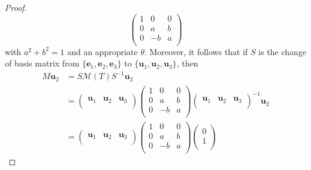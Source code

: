 \documentclass[../psets.tex]{subfiles}
\begin{document}
\begin{enumerate}
\begin{enumerate}
\begin{proof}
\begin{equation*}
                \begin{pmatrix}
                    1 & 0 & 0\\
                    0 & a & b\\
                    0 & -b & a\\
                \end{pmatrix}
            \end{equation*}
            with $a^2+b^2=1$ and an appropriate $\theta$. Moreover, it follows that if $S$ is the change of basis matrix from $\{\mathbf{e}_1,\mathbf{e}_2,\mathbf{e}_3\}$ to $\{\mathbf{u}_1,\mathbf{u}_2,\mathbf{u}_3\}$, then
            \begin{align*}
                M\mathbf{u}_2 &= S\mathcal{M}(T)S^{-1}\mathbf{u}_2\\
                &=
                \begin{pmatrix}
                    \mathbf{u}_1 & \mathbf{u}_2 & \mathbf{u}_3\\
                \end{pmatrix}
                \begin{pmatrix}
                    1 & 0 & 0\\
                    0 & a & b\\
                    0 & -b & a\\
                \end{pmatrix}
                \begin{pmatrix}
                    \mathbf{u}_1 & \mathbf{u}_2 & \mathbf{u}_3\\
                \end{pmatrix}^{-1}
                \mathbf{u}_2\\
                &=
                \begin{pmatrix}
                    \mathbf{u}_1 & \mathbf{u}_2 & \mathbf{u}_3\\
                \end{pmatrix}
                \begin{pmatrix}
                    1 & 0 & 0\\
                    0 & a & b\\
                    0 & -b & a\\
                \end{pmatrix}
                \begin{pmatrix}
                    0\\
                    1\\

\end{pmatrix}
\end{align*}
\end{proof}
\end{enumerate}
\end{enumerate}
\end{document}
